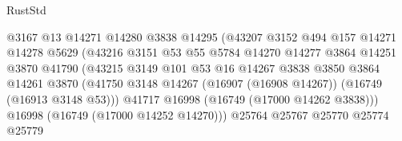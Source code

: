 \begin{lexlean}{RustStd}
\begin{coremodule}
                                        @3167
                                        @13
                                        @14271
                                        @14280
                                        @3838
                                        @14295
                                        (@43207
                                          @3152
                                          @494
                                          @157
                                          @14271
                                          @14278
                                          @5629
                                          (@43216
                                            @3151
                                            @53
                                            @55
                                            @5784
                                            @14270
                                            @14277
                                            @3864
                                            @14251
                                            @3870
                                            @41790
                                            (@43215
                                              @3149
                                              @101
                                              @53
                                              @16
                                              @14267
                                              @3838
                                              @3850
                                              @3864
                                              @14261
                                              @3870
                                              (@41750
                                                @3148
                                                @14267
                                                (@16907 (@16908 @14267))
                                                (@16749 (@16913 @3148 @53)))
                                              @41717
                                              @16998
                                              (@16749 (@17000 @14262 @3838)))
                                            @16998
                                            (@16749 (@17000 @14252 @14270)))
                                          @25764
                                          @25767
                                          @25770
                                          @25774
                                          @25779

\end{coremodule}
\end{lexlean}
